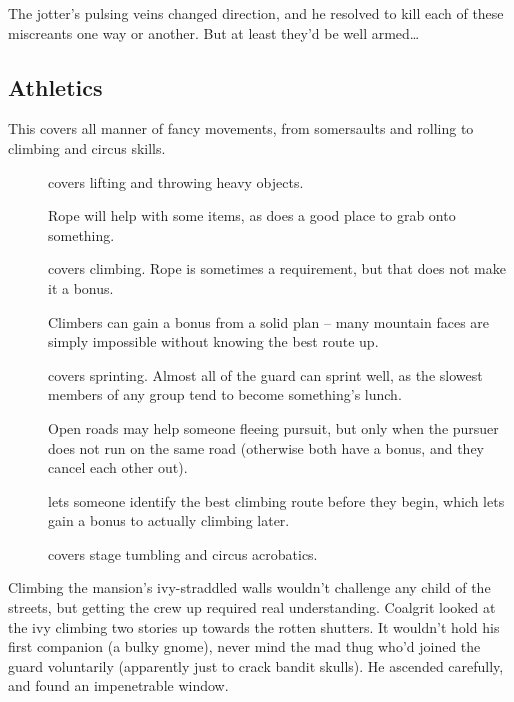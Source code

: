 \begin{multicols}{2}
\begin{exampletext}
  The \gls{jotter}'s pulsing veins changed direction, and he resolved to kill each of these miscreants one way or another.
  But at least they'd be well armed\ldots

\end{exampletext}

\subsection{Athletics}

This covers all manner of fancy movements, from somersaults and rolling to climbing and circus skills.


\begin{description}
  \item[]
    covers lifting and throwing heavy objects.

    Rope will help with some items, as does a good place to grab onto something.
  \item[]
    covers climbing.
    Rope is sometimes a requirement, but that does not make it a bonus.

    Climbers can gain a bonus from a solid plan -- many mountain faces are simply impossible without knowing the best route up.
  \item[]
    covers sprinting.
    Almost all of the \gls{guard} can sprint well, as the slowest members of any group tend to become something's lunch.

    Open roads may help someone fleeing pursuit, but only when the pursuer does not run on the same road (otherwise both have a bonus, and they cancel each other out).
  \item[]
    lets someone identify the best climbing route before they begin, which lets gain a bonus to actually climbing later.
  \item[]
    covers stage tumbling and circus acrobatics.
\end{description}

\begin{exampletext}
  Climbing the mansion's ivy-straddled walls wouldn't challenge any child of the streets, but getting the crew up required real understanding.
  Coalgrit looked at the ivy climbing two stories up towards the rotten shutters.
  It wouldn't hold his first companion (a bulky gnome), never mind the mad thug who'd joined the \gls{guard} voluntarily (apparently just to crack bandit skulls).
  He ascended carefully, and found an impenetrable window.


\end{exampletext}
\end{multicols}
